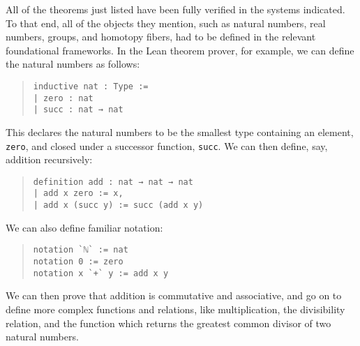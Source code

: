 \documentclass[12pt]{article}
\newcommand{\ttt}[1]{\texttt{#1}}
\begin{document}
All of the theorems just listed have been fully verified in the systems indicated. To that end, all of the objects they mention, such as natural numbers, real numbers, groups, and homotopy fibers, had to be defined in the relevant foundational frameworks. In the Lean theorem prover, for example, we can define the natural numbers as follows:
\begin{quote}\begin{lstlisting}
inductive nat : Type :=
| zero : nat
| succ : nat → nat
\end{lstlisting}\end{quote}
This declares the natural numbers to be the smallest type containing an element, \ttt{zero}, and closed under a successor function, \ttt{succ}. We can then define, say, addition recursively:
\begin{quote}\begin{lstlisting}
definition add : nat → nat → nat
| add x zero := x,
| add x (succ y) := succ (add x y)
\end{lstlisting}\end{quote}
We can also define familiar notation:
\begin{quote}\begin{lstlisting}
notation `ℕ` := nat
notation 0 := zero
notation x `+` y := add x y
\end{lstlisting}\end{quote}
We can then prove that addition is commutative and associative, and go on to define more complex functions and relations, like multiplication, the divisibility relation, and the function which returns the greatest common divisor of two natural numbers. 
\end{document}
